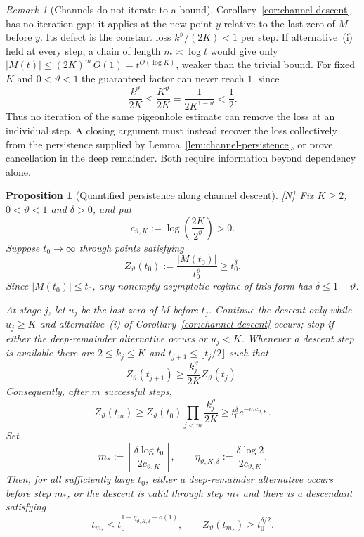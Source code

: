 \documentclass[11pt]{amsart}
\numberwithin{equation}{section}
\theoremstyle{plain}
\newtheorem{proposition}[theorem]{Proposition}
\theoremstyle{definition}
\theoremstyle{remark}
\newtheorem{remark}[theorem]{Remark}
\newcommand{\tagN}{\textup{[N]}}
\begin{document}
\begin{remark}[Channels do not iterate to a bound]
\label{rem:channel-loss}
Corollary~\ref{cor:channel-descent} has no iteration gap: it applies at
the new point $y$ relative to the last zero of $M$ before $y$. Its defect
is the constant loss $k^\vartheta/(2K)<1$ per step. If alternative~(i) held at
every step, a chain of length $m\asymp\log t$ would give only
$|M(t)|\le(2K)^m\,O(1)=t^{O(\log K)}$, weaker than the trivial bound.
For fixed $K$ and $0<\vartheta<1$ the guaranteed factor can never reach
$1$, since
\[
 \frac{k^\vartheta}{2K}\le\frac{K^\vartheta}{2K}
 =\frac1{2K^{1-\vartheta}}<\frac12.
\]
Thus no iteration of the same pigeonhole estimate can remove the loss at an
individual step.  A closing argument must instead recover the loss
collectively from the persistence supplied by
Lemma~\ref{lem:channel-persistence}, or prove cancellation in the deep
remainder.  Both require information beyond dependency alone.
\end{remark}



\begin{proposition}[Quantified persistence along channel descent]
\label{prop:quantified-channel-persistence}
\tagN\ Fix $K\ge2$, $0<\vartheta<1$ and $\delta>0$, and put
\[
 c_{\vartheta,K}:=\log\!\left(\frac{2K}{2^\vartheta}\right)>0.
\]
Suppose $t_0\to\infty$ through points satisfying
\[
 Z_\vartheta(t_0):=\frac{|M(t_0)|}{t_0^\vartheta}\ge t_0^\delta.
\]
Since $|M(t_0)|\le t_0$, any nonempty asymptotic regime of this form has
$\delta\le1-\vartheta$.

At stage $j$, let $u_j$ be the last zero of $M$ before $t_j$. Continue the
descent only while $u_j\ge K$ and alternative~\textup{(i)} of
Corollary~\ref{cor:channel-descent} occurs; stop if either the deep-remainder
alternative occurs or $u_j<K$. Whenever a descent step is available there
are $2\le k_j\le K$ and $t_{j+1}\le\lfloor t_j/2\rfloor$ such that
\[
 Z_\vartheta(t_{j+1})\ge\frac{k_j^\vartheta}{2K}Z_\vartheta(t_j).
\]
Consequently, after $m$ successful steps,
\begin{equation}
\label{eq:channel-product-persistence}
 Z_\vartheta(t_m)
 \ge Z_\vartheta(t_0)\prod_{j<m}\frac{k_j^\vartheta}{2K}
 \ge t_0^\delta e^{-m c_{\vartheta,K}}.
\end{equation}
Set
\[
 m_*:=\left\lfloor\frac{\delta\log t_0}{2c_{\vartheta,K}}\right\rfloor,
 \qquad
 \eta_{\vartheta,K,\delta}:=
 \frac{\delta\log2}{2c_{\vartheta,K}}.
\]
Then, for all sufficiently large $t_0$, either a deep-remainder alternative
occurs before step $m_*$, or the descent is valid through step $m_*$ and
there is a descendant satisfying
\[
 t_{m_*}\le t_0^{1-\eta_{\vartheta,K,\delta}+o(1)},
 \qquad
 Z_\vartheta(t_{m_*})\ge t_0^{\delta/2}.
\]
\end{proposition}
\end{document}
